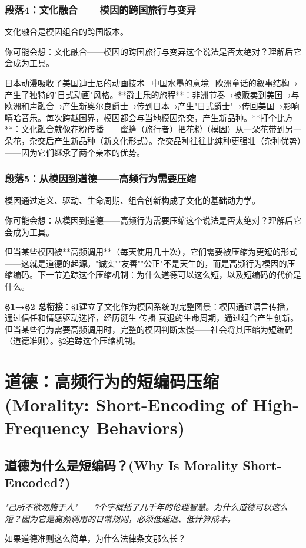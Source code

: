 \documentclass[a4paper,12pt]{book}
\newenvironment{motivation}{\begin{tcolorbox}[colback=gray!10,colframe=gray!60,title=\textit{动机}]\small\itshape}{\end{tcolorbox}}
\newenvironment{questionbox}{\begin{tcolorbox}[colback=red!3,colframe=red!60]}{\end{tcolorbox}}
\begin{document}
\begin{motivation}
\begin{motivation}
\begin{motivation}
	\subsubsection*{段落4：文化融合——模因的跨国旅行与变异}
文化融合是模因组合的跨国版本。
	\begin{tcolorbox}[colback=yellow!5, title=\textit{读者行为预测}]
		你可能会想：文化融合——模因的跨国旅行与变异这个说法是否太绝对？理解后它会成为工具。
	\end{tcolorbox}

日本动漫吸收了美国迪士尼的动画技术+中国水墨的意境+欧洲童话的叙事结构→产生了独特的"日式动画"风格。**爵士乐的旅程**：非洲节奏→被贩卖到美国→与欧洲和声融合→产生新奥尔良爵士→传到日本→产生"日式爵士"→传回美国→影响嘻哈音乐。每次跨越国界，模因都会与当地模因杂交，产生新品种。**打个比方**：文化融合就像花粉传播——蜜蜂（旅行者）把花粉（模因）从一朵花带到另一朵花，杂交后产生新品种（新文化形式）。杂交品种往往比纯种更强壮（杂种优势）——因为它们继承了两个亲本的优势。

	\subsubsection*{段落5：从模因到道德——高频行为需要压缩}
模因通过定义、驱动、生命周期、组合创新构成了文化的基础动力学。
	\begin{tcolorbox}[colback=yellow!5, title=\textit{读者行为预测}]
		你可能会想：从模因到道德——高频行为需要压缩这个说法是否太绝对？理解后它会成为工具。
	\end{tcolorbox}

但当某些模因被**高频调用**（每天使用几十次），它们需要被压缩为更短的形式——这就是道德的起源。"诚实""友善""公正"不是天生的，而是高频行为模因的压缩编码。下一节追踪这个压缩机制：为什么道德可以这么短，以及短编码的代价是什么。

	\textbf{§1→§2 总衔接}：§1建立了文化作为模因系统的完整图景：模因通过语言传播，通过信任和情感驱动选择，经历诞生-传播-衰退的生命周期，通过组合产生创新。但当某些行为需要高频调用时，完整的模因判断太慢——社会将其压缩为短编码（道德准则）。§2追踪这个压缩机制。

	
	\section{道德：高频行为的短编码压缩 (Morality: Short-Encoding of High-Frequency Behaviors)}

	\subsection{道德为什么是短编码？(Why Is Morality Short-Encoded?)}
	\begin{motivation}
		"己所不欲勿施于人"——7个字概括了几千年的伦理智慧。为什么道德可以这么短？因为它是高频调用的日常规则，必须低延迟、低计算成本。
	\end{motivation}
	\begin{questionbox}
		如果道德准则这么简单，为什么法律条文那么长？
	\end{questionbox}


\end{motivation}
\end{motivation}
\end{motivation}
\end{document}
